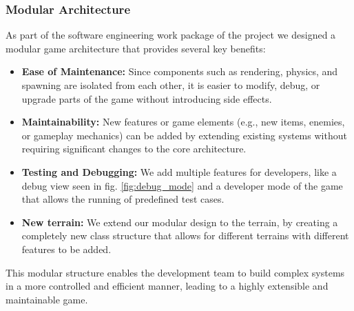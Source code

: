 \subsubsection{Modular Architecture}
As part of the software engineering work package of the project we designed a modular game architecture that provides several key benefits:
\begin{itemize}
    \item \textbf{Ease of Maintenance:} Since components such as rendering, physics, and spawning are isolated from each other, it is easier to modify, debug, or upgrade parts of the game without introducing side effects.
    \item \textbf{Maintainability:} New features or game elements (e.g., new items, enemies, or gameplay mechanics) can be added by extending existing systems without requiring significant changes to the core architecture.
    \item \textbf{Testing and Debugging:} We add multiple features for developers, like a debug view seen in fig. \ref{fig:debug_mode} and a developer mode of the game that allows the running of predefined test cases. 
    \item \textbf{New terrain:} We extend our modular design to the terrain, by creating a completely new class structure that allows for different terrains with different features to be added.
\end{itemize}
This modular structure enables the development team to build complex systems in a more controlled and efficient manner, leading to a highly extensible and maintainable game.